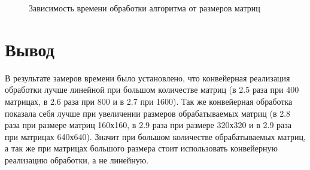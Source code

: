 \begin{figure}[H]
	\hspace*{-1cm}
	\centering
	\caption{Зависимость времени обработки алгоритма от размеров матриц } 
	\label{img:graph_diff_sizes}
\end{figure} 

\section*{Вывод}
В результате замеров времени было установлено, что конвейерная реализация обработки лучше линейной при большом количестве матриц (в 2.5 раза при 400 матрицах, в 2.6 раза при 800 и в 2.7 при 1600). Так же конвейерная обработка показала себя лучше при увеличении размеров обрабатываемых матриц (в 2.8 раза при размере матриц 160х160, в 2.9 раза при размере 320х320 и в 2.9 раза при матрицах 640х640). Значит при большом количестве обрабатываемых матриц, а так же при матрицах большого размера стоит использовать конвейерную реализацию обработки, а не линейную.